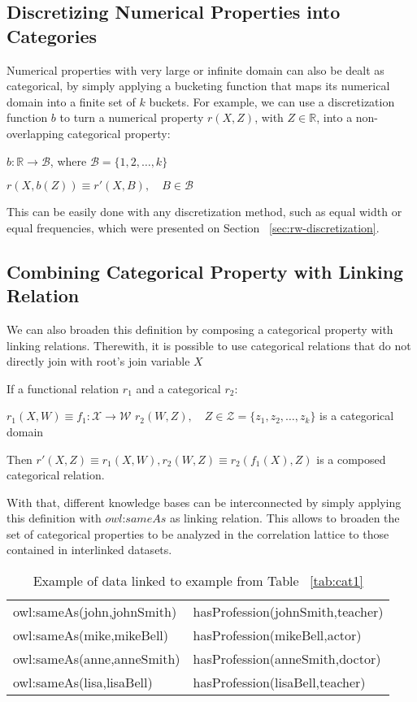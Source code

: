 \subsection{Discretizing Numerical Properties into Categories}

Numerical properties with very large or infinite domain can also be dealt as categorical, by simply applying a
bucketing
function that maps its numerical domain into a finite set of $k$ buckets. For example, we can use a discretization
function $b$ to turn a numerical property $r(X,Z)$, with $Z \in \mathbb{R}$, into a non-overlapping categorical
property:

\begin{center}
 $b: \mathbb{R} \rightarrow \mathcal{B}$, where $\mathcal{B}=\{1,2,\dots ,k \}$
\end{center}

\begin{center}
 $r(X,b(Z)) \equiv r'(X,B) , \quad B \in \mathcal{B}$
\end{center}

This can be easily done with any discretization method, such as equal width or equal frequencies, which were
presented on Section ~\ref{sec:rw-discretization}.

\subsection{Combining Categorical Property with Linking Relation}
We can also broaden this definition by composing a categorical property with linking relations. Therewith, it is
possible to use categorical relations that do not directly join with root's join variable $X$

If a functional relation $r_1$ and a categorical $r_2$:

$r_1(X,W) \equiv f_1 : \mathcal{X} \rightarrow \mathcal{W}$ \newline
$r_2(W,Z),\quad Z \in \mathcal{Z}=\{z_1,z_2,\ldots,z_k\}$ is a categorical domain 

Then $r'(X,Z) \equiv r_1(X,W),r_2(W,Z) \equiv r_2(f_1(X),Z)$ is a composed categorical relation. 

With that, different knowledge bases can be interconnected by simply applying this definition with $owl$:$sameAs$
as linking relation. This allows to broaden the set of categorical properties to be analyzed in the correlation
lattice
to those contained in interlinked datasets.

\begin{table}[h!]
 \label{tab:cat2}
 \caption{Example of data linked to example from Table ~\ref{tab:cat1}}
 \begin{tabular}{*{2}{l}}
    owl:sameAs(john,johnSmith)& hasProfession(johnSmith,teacher) 	 \\
    owl:sameAs(mike,mikeBell) & hasProfession(mikeBell,actor) 	 \\
    owl:sameAs(anne,anneSmith)& hasProfession(anneSmith,doctor)	 \\
    owl:sameAs(lisa,lisaBell) & hasProfession(lisaBell,teacher) 
  \end{tabular}
\end{table}

